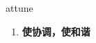 
\begin{frame}
{\huge attune}
\begin{center}
\begin{enumerate}\Large
  \item \textbf{使协调，使和谐}
\end{enumerate}
\end{center}
\end{frame}
